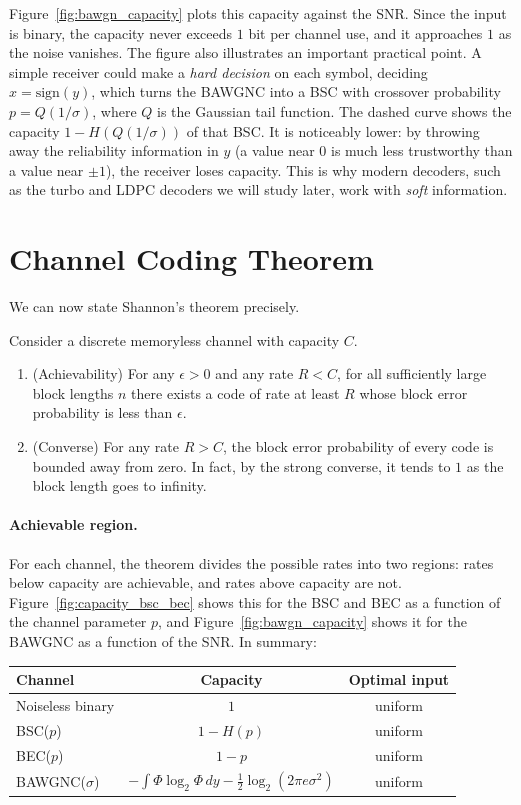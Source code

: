 Figure~\ref{fig:bawgn_capacity} plots this capacity against the SNR. Since the input is binary, the capacity never exceeds \(1\) bit per channel use, and it approaches \(1\) as the noise vanishes. The figure also illustrates an important practical point. A simple receiver could make a \emph{hard decision} on each symbol, deciding \(\hat{x} = \mathrm{sign}(y)\), which turns the BAWGNC into a BSC with crossover probability \(p = Q(1/\sigma)\), where \(Q\) is the Gaussian tail function. The dashed curve shows the capacity \(1 - H(Q(1/\sigma))\) of that BSC. It is noticeably lower: by throwing away the reliability information in \(y\) (a value near \(0\) is much less trustworthy than a value near \(\pm 1\)), the receiver loses capacity. This is why modern decoders, such as the turbo and LDPC decoders we will study later, work with \emph{soft} information.

\section{Channel Coding Theorem}\label{sec:coding_thm}
We can now state Shannon's theorem precisely.
\begin{theorem}\label{thm:coding}
Consider a discrete memoryless channel with capacity \(C\).
\begin{enumerate}
    \item (Achievability) For any \(\epsilon > 0\) and any rate \(R < C\), for all sufficiently large block lengths \(n\) there exists a code of rate at least \(R\) whose block error probability is less than \(\epsilon\).
    \item (Converse) For any rate \(R > C\), the block error probability of every code is bounded away from zero. In fact, by the strong converse, it tends to \(1\) as the block length goes to infinity.
\end{enumerate}
\end{theorem}

\paragraph{Achievable region.} For each channel, the theorem divides the possible rates into two regions: rates below capacity are achievable, and rates above capacity are not. Figure~\ref{fig:capacity_bsc_bec} shows this for the BSC and BEC as a function of the channel parameter \(p\), and Figure~\ref{fig:bawgn_capacity} shows it for the BAWGNC as a function of the SNR. In summary:
\begin{center}
\begin{tabular}{lcc}
\hline
Channel & Capacity & Optimal input \\
\hline
Noiseless binary & \(1\) & uniform \\
BSC(\(p\)) & \(1-H(p)\) & uniform \\
BEC(\(p\)) & \(1-p\) & uniform \\
BAWGNC(\(\sigma\)) & \(-\int \Phi \log_2 \Phi\, dy - \frac{1}{2}\log_2(2\pi e\sigma^2)\) & uniform \\
\hline
\end{tabular}
\end{center}

